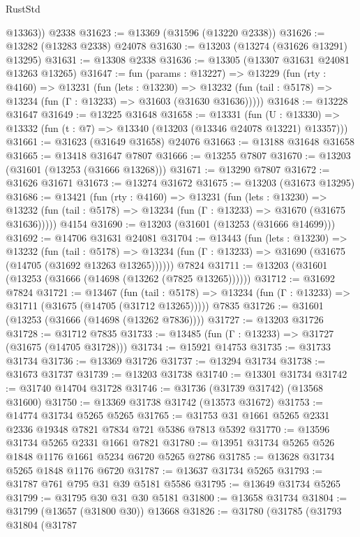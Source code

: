 \begin{lexlean}{RustStd}
\begin{coremodule}
        @13363))
    @2338
@31623 := @13369 (@31596 (@13220 @2338))
@31626 := @13282 (@13283 @2338) @24078
@31630 := @13203 (@13274 (@31626 @13291) @13295)
@31631 := @13308 @2338
@31636 := @13305 (@13307 @31631 @24081 @13263 @13265)
@31647 := fun (params : @13227) =>
  @13229
    (fun (rty : @4160) =>
    @13231
      (fun (lets : @13230) =>
      @13232 (fun (tail : @5178) => @13234 (fun (Γ : @13233) => @31603 (@31630 @31636)))))
@31648 := @13228 @31647
@31649 := @13225 @31648
@31658 := @13331
    (fun (U : @13330) => @13332 (fun (t : @7) => @13340 (@13203 (@13346 @24078 @13221) @13357)))
@31661 := @31623 (@31649 @31658) @24076
@31663 := @13188 @31648 @31658
@31665 := @13418 @31647 @7807
@31666 := @13255 @7807
@31670 := @13203 (@31601 (@13253 (@31666 @13268)))
@31671 := @13290 @7807
@31672 := @31626 @31671
@31673 := @13274 @31672
@31675 := @13203 (@31673 @13295)
@31686 := @13421
    (fun (rty : @4160) =>
    @13231
      (fun (lets : @13230) =>
      @13232 (fun (tail : @5178) => @13234 (fun (Γ : @13233) => @31670 (@31675 @31636)))))
    @4154
@31690 := @13203 (@31601 (@13253 (@31666 @14699)))
@31692 := @14706 @31631 @24081
@31704 := @13443
    (fun (lets : @13230) =>
    @13232
      (fun (tail : @5178) =>
      @13234 (fun (Γ : @13233) => @31690 (@31675 (@14705 (@31692 @13263 @13265))))))
    @7824
@31711 := @13203 (@31601 (@13253 (@31666 (@14698 (@13262 (@7825 @13265))))))
@31712 := @31692 @7824
@31721 := @13467
    (fun (tail : @5178) => @13234 (fun (Γ : @13233) => @31711 (@31675 (@14705 (@31712 @13265)))))
    @7835
@31726 := @31601 (@13253 (@31666 (@14698 (@13262 @7836))))
@31727 := @13203 @31726
@31728 := @31712 @7835
@31733 := @13485 (fun (Γ : @13233) => @31727 (@31675 (@14705 @31728)))
@31734 := @15921 @14753
@31735 := @31733 @31734
@31736 := @13369 @31726
@31737 := @13294 @31734
@31738 := @31673 @31737
@31739 := @13203 @31738
@31740 := @13301 @31734
@31742 := @31740 @14704 @31728
@31746 := @31736 (@31739 @31742) (@13568 @31600)
@31750 := @13369 @31738 @31742 (@13573 @31672)
@31753 := @14774 @31734 @5265 @5265
@31765 := @31753 @31 @1661 @5265 @2331 @2336 @19348 @7821 @7834 @721 @5386 @7813 @5392
@31770 := @13596 @31734 @5265 @2331 @1661 @7821
@31780 := @13951 @31734 @5265 @526 @1848 @1176 @1661 @5234 @6720 @5265 @2786
@31785 := @13628 @31734 @5265 @1848 @1176 @6720
@31787 := @13637 @31734 @5265
@31793 := @31787 @761 @795 @31 @39 @5181 @5586
@31795 := @13649 @31734 @5265
@31799 := @31795 @30 @31 @30 @5181
@31800 := @13658 @31734
@31804 := @31799 (@13657 (@31800 @30)) @13668
@31826 := @31780
    (@31785
      (@31793
        @31804
        (@31787

\end{coremodule}
\end{lexlean}
